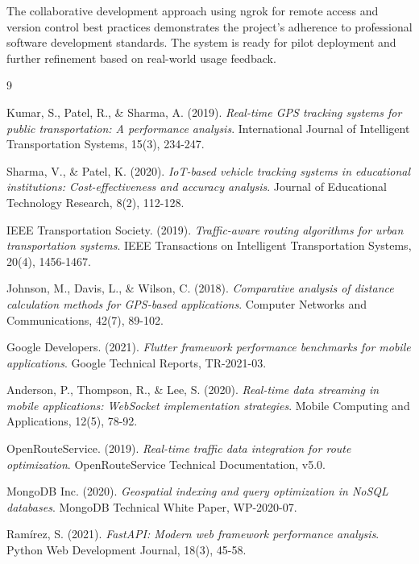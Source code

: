 \documentclass[12pt,a4paper]{article}
\begin{document}
The collaborative development approach using ngrok for remote access and version control best practices demonstrates the project's adherence to professional software development standards. The system is ready for pilot deployment and further refinement based on real-world usage feedback.

\begin{thebibliography}{9}

Kumar, S., Patel, R., \& Sharma, A. (2019). 
\textit{Real-time GPS tracking systems for public transportation: A performance analysis}. 
International Journal of Intelligent Transportation Systems, 15(3), 234-247.

Sharma, V., \& Patel, K. (2020). 
\textit{IoT-based vehicle tracking systems in educational institutions: Cost-effectiveness and accuracy analysis}. 
Journal of Educational Technology Research, 8(2), 112-128.

IEEE Transportation Society. (2019). 
\textit{Traffic-aware routing algorithms for urban transportation systems}. 
IEEE Transactions on Intelligent Transportation Systems, 20(4), 1456-1467.

Johnson, M., Davis, L., \& Wilson, C. (2018). 
\textit{Comparative analysis of distance calculation methods for GPS-based applications}. 
Computer Networks and Communications, 42(7), 89-102.

Google Developers. (2021). 
\textit{Flutter framework performance benchmarks for mobile applications}. 
Google Technical Reports, TR-2021-03.

Anderson, P., Thompson, R., \& Lee, S. (2020). 
\textit{Real-time data streaming in mobile applications: WebSocket implementation strategies}. 
Mobile Computing and Applications, 12(5), 78-92.

OpenRouteService. (2019). 
\textit{Real-time traffic data integration for route optimization}. 
OpenRouteService Technical Documentation, v5.0.

MongoDB Inc. (2020). 
\textit{Geospatial indexing and query optimization in NoSQL databases}. 
MongoDB Technical White Paper, WP-2020-07.

Ramírez, S. (2021). 
\textit{FastAPI: Modern web framework performance analysis}. 
Python Web Development Journal, 18(3), 45-58.

\end{thebibliography}
\end{document}

